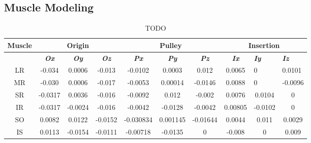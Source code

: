 \documentclass[11pt,a4paper,draft=false]{report}
\begin{document}
\subsection*{Muscle Modeling}\label{sec:muscle-modeling}

\begin{table}[h]
  \caption{TODO}\label{tab:muscle-path}
  \begin{tabular}{@{}cccccccccc@{}}
    \toprule
    \textbf{Muscle} & \multicolumn{3}{c}{\textbf{Origin}}                                & \multicolumn{3}{c}{\textbf{Pulley}}                                & \multicolumn{3}{c}{\textbf{Insertion}}                                                                      \\ \midrule
                    & \textit{\textbf{Ox}} & \textit{\textbf{Oy}} & \textit{\textbf{Oz}} & \textit{\textbf{Px}} & \textit{\textbf{Py}} & \textit{\textbf{Pz}} & \textit{\textbf{Ix}} & \multicolumn{1}{l}{\textit{\textbf{Iy}}} & \multicolumn{1}{l}{\textit{\textbf{Iz}}} \\ \midrule
    LR              & -0.034               & 0.0006               & -0.013               & -0.0102              & 0.0003               & 0.012                & 0.0065               & \multicolumn{1}{l}{0}                    & \multicolumn{1}{l}{0.0101}               \\
    MR              & -0.030               & 0.0006               & -0.017               & -0.0053              & 0.00014              & -0.0146              & 0.0088               & \multicolumn{1}{l}{0}                    & \multicolumn{1}{l}{-0.0096}              \\
    SR              & -0.0317              & 0.0036               & -0.016               & -0.0092              & 0.012                & -0.002               & 0.0076               & 0.0104                                   & 0                                        \\
    IR              & -0.0317              & -0.0024              & -0.016               & -0.0042              & -0.0128              & -0.0042              & 0.00805              & -0.0102                                  & 0                                        \\
    SO              & 0.0082               & 0.0122               & -0.0152              & -0.030834            & 0.001145             & -0.01644             & 0.0044               & 0.011                                    & 0.0029                                   \\
    IS              & 0.0113               & -0.0154              & -0.0111
                    & -0.00718             & -0.0135              & 0
                                                                                         &
                                                                                           -0.008
                                                                                                                & 0                                        & 0.009 \\
    \bottomrule
  \end{tabular}
\end{table}
\end{document}
